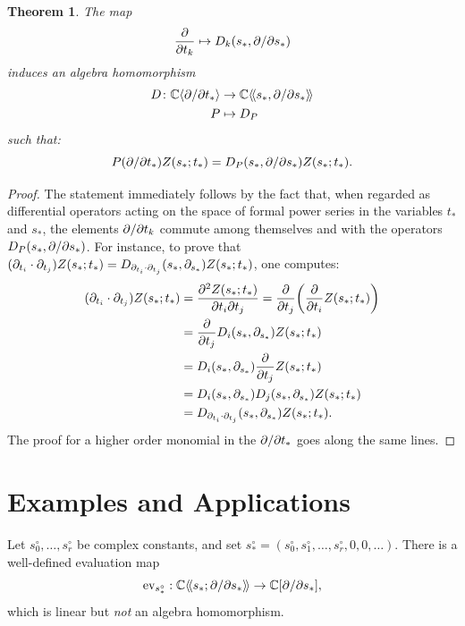 \documentclass[11pt,twoside]{article}
\theoremstyle{plain}
\newtheorem{theorem}{Theorem}
\theoremstyle{remark}
\theoremstyle{definition}
\numberwithin{equation}{section} %
\begin{document}
\begin{theorem}\label{theorem:2}
The map
\begin{equation*}
  \frac{\del}{\del t_k}\mapsto D_k(s_*,\del/\del s_*)
\end{equation*} 
induces an algebra homomorphism
\begin{align*}
D\colon \setC\langle \del/\del t_*\rangle&\to
\setC\langle\!\langle s_*,\del/\del
s_*\rangle\!\rangle\\
P&\mapsto D_P
\end{align*}
such that:
  \begin{equation}\label{eq:t2}
    P(\del / \del{t_*})Z(s_*;t_*)
    =D_{P}(s_*,\del /\del{s_*})Z(s_*;t_*).
  \end{equation}
 \end{theorem}
\begin{proof}  
  The statement immediately follows by the fact that, when regarded as
  differential operators acting on the space of formal power series in
  the variables $t_*$ and $s_*$, the elements $\partial/\partial t_k$ commute
  among themselves and with the operators $D_{P}(s_*,\partial / \partial{s_*})$. For
  instance, to prove that $(\partial_{t_i}\cdot
  \partial_{t_j})Z(s_*;t_*)=D_{\partial_{t_i}\cdot
    \partial_{t_j}}(s_*,\partial_{s_*})Z(s_*;t_*)$, one computes:
\begin{align*}
(\del_{t_i}\cdot \del_{t_j})Z(s_*;t_*)&=
\frac{\del^2 Z(s_*;t_*)}{\del t_i\del t_j}=\frac{\del}{\del t_j}\biggl(
\frac{\del}{\del t_i}Z(s_*;t_*)\biggr)\\
&=\frac{\del}{\del
t_j}D_i(s_*,\del_{s_*})Z(s_*;t_*)\\
&=D_i(s_*,\del_{s_*})\frac{\del}{\del t_j}Z(s_*;t_*)\\
&=D_i(s_*,\del_{s_*})D_j(s_*,\del_{s_*})Z(s_*;t_*)\\
&=D_{\del_{t_i}\cdot \del_{t_j}}(s_*,\del_{s_*})Z(s_*;t_*).
\end{align*}
The proof for a higher order monomial in the $\partial/\partial t_*$ goes
along the same lines.
\end{proof}  



\section{Examples and Applications}
\label{sec:final}

Let $s^\circ_0, \dots, s^\circ_r$ be complex constants, and set
$s^\circ_*=(s^\circ_0,s^\circ_1,\dots,s^\circ_r,0,0,\dots)$.  There
is a well-defined evaluation map
\begin{equation*}
  \ev_{s^\circ_*} : \setC\langle\!\langle s_*; \del / \del s_* \rangle\!\rangle \to \setC [\del / \del s_*],
\end{equation*}
which is linear but \emph{not} an algebra homomorphism.
\end{document}

